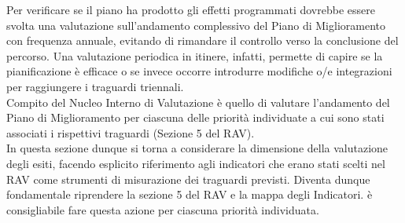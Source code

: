 \documentclass[12pt,a4paper,oneside]{memoir}
\begin{document}
Per verificare se il piano ha prodotto gli effetti programmati dovrebbe essere svolta una valutazione sull'andamento complessivo del Piano di Miglioramento con frequenza annuale, evitando di rimandare il controllo verso la conclusione del percorso. Una valutazione periodica in itinere, infatti, permette di capire se la pianificazione è efficace o se invece occorre introdurre modifiche o/e integrazioni per raggiungere i traguardi triennali.\\

Compito del Nucleo Interno di Valutazione è quello di valutare l'andamento del Piano di Miglioramento per ciascuna delle priorità individuate a cui sono stati associati i rispettivi traguardi (Sezione 5 del RAV).\\

 

In questa sezione dunque si torna a considerare la dimensione della valutazione degli esiti, facendo esplicito riferimento agli indicatori che erano stati scelti nel RAV come strumenti di misurazione dei traguardi previsti. Diventa dunque fondamentale riprendere la sezione 5 del RAV e la mappa degli Indicatori. è consigliabile fare questa azione per ciascuna priorità individuata.\\
\end{document}
